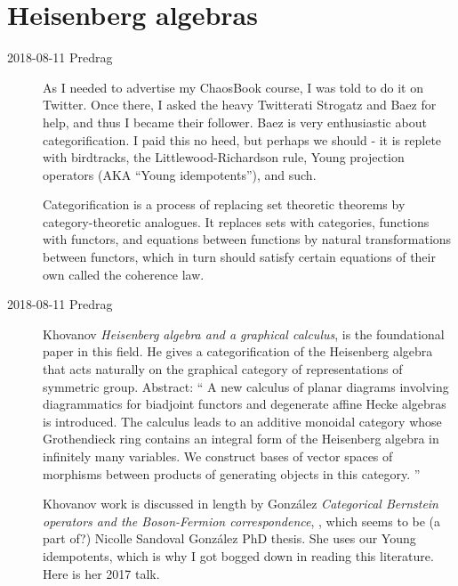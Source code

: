 \begin{description}
\end{description}

\section{Heisenberg algebras}
\label{s-Heisenberg}

\begin{description}

\item[2018-08-11 Predrag]
As I needed to advertise my
 {ChaosBook} course, I was
told to do it on Twitter. Once there, I asked the heavy Twitterati
Strogatz and  {Baez} for help,
and thus I became their follower. Baez is very enthusiastic about
categorification. I paid this no heed, but perhaps we should - it is
replete with birdtracks, the Littlewood-Richardson rule, Young projection
operators (AKA ``Young idempotents''), and such.

Categorification is a process of replacing set theoretic
theorems by category-theoretic analogues. It replaces sets with
categories, functions with functors, and equations between functions by
natural transformations between functors, which in turn should satisfy
certain equations of their own called the coherence law.

\item[2018-08-11 Predrag]
Khovanov {\em Heisenberg algebra and a graphical calculus},
 is the foundational paper in this field.
He gives a categorification of the Heisenberg algebra that acts naturally
on the graphical category of representations  of  symmetric  group.
Abstract: ``
A new calculus of planar diagrams involving diagrammatics for biadjoint
functors and degenerate affine Hecke algebras is introduced. The calculus
leads to an additive monoidal category whose Grothendieck ring contains
an integral form of the Heisenberg algebra in infinitely many variables.
We construct bases of vector spaces of morphisms between products of
generating objects in this category.
''

Khovanov work is discussed in length by
Gonz{\'a}lez {\em Categorical {Bernstein} operators and the
{Boson-Fermion} correspondence}, ,
which seems to be (a part of?)
{Nicolle Sandoval Gonz{\'a}lez} PhD thesis. She uses our Young idempotents,
which is why I got bogged down in reading this literature. Here is her
 {2017 talk}.


\end{description}
